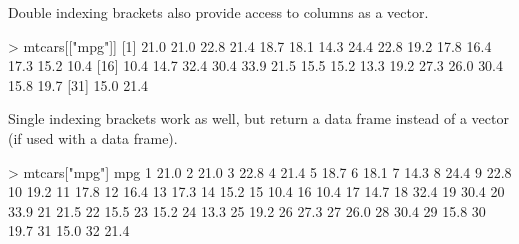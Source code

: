 \documentclass[
]{book}
\newenvironment{Shaded}{\begin{snugshade}}{\end{snugshade}}
\newcommand{\DecValTok}[1]{\textcolor[rgb]{0.00,0.00,0.81}{#1}}
\newcommand{\FloatTok}[1]{\textcolor[rgb]{0.00,0.00,0.81}{#1}}
\newcommand{\NormalTok}[1]{#1}
\newcommand{\SpecialCharTok}[1]{\textcolor[rgb]{0.00,0.00,0.00}{#1}}
\newcommand{\StringTok}[1]{\textcolor[rgb]{0.31,0.60,0.02}{#1}}
\begin{document}
Double indexing brackets also provide access to columns as a vector.

\begin{Shaded}
\begin{Highlighting}[]
\SpecialCharTok{\textgreater{}}\NormalTok{ mtcars[[}\StringTok{"mpg"}\NormalTok{]]}
\NormalTok{ [}\DecValTok{1}\NormalTok{] }\FloatTok{21.0} \FloatTok{21.0} \FloatTok{22.8} \FloatTok{21.4} \FloatTok{18.7} \FloatTok{18.1} \FloatTok{14.3} \FloatTok{24.4} \FloatTok{22.8} \FloatTok{19.2} \FloatTok{17.8} \FloatTok{16.4} \FloatTok{17.3} \FloatTok{15.2} \FloatTok{10.4}
\NormalTok{[}\DecValTok{16}\NormalTok{] }\FloatTok{10.4} \FloatTok{14.7} \FloatTok{32.4} \FloatTok{30.4} \FloatTok{33.9} \FloatTok{21.5} \FloatTok{15.5} \FloatTok{15.2} \FloatTok{13.3} \FloatTok{19.2} \FloatTok{27.3} \FloatTok{26.0} \FloatTok{30.4} \FloatTok{15.8} \FloatTok{19.7}
\NormalTok{[}\DecValTok{31}\NormalTok{] }\FloatTok{15.0} \FloatTok{21.4}
\end{Highlighting}
\end{Shaded}

Single indexing brackets work as well, but return a data frame instead of a vector (if used with a data frame).

\begin{Shaded}
\begin{Highlighting}[]
\SpecialCharTok{\textgreater{}}\NormalTok{ mtcars[}\StringTok{"mpg"}\NormalTok{]}
\NormalTok{    mpg}
\DecValTok{1}  \FloatTok{21.0}
\DecValTok{2}  \FloatTok{21.0}
\DecValTok{3}  \FloatTok{22.8}
\DecValTok{4}  \FloatTok{21.4}
\DecValTok{5}  \FloatTok{18.7}
\DecValTok{6}  \FloatTok{18.1}
\DecValTok{7}  \FloatTok{14.3}
\DecValTok{8}  \FloatTok{24.4}
\DecValTok{9}  \FloatTok{22.8}
\DecValTok{10} \FloatTok{19.2}
\DecValTok{11} \FloatTok{17.8}
\DecValTok{12} \FloatTok{16.4}
\DecValTok{13} \FloatTok{17.3}
\DecValTok{14} \FloatTok{15.2}
\DecValTok{15} \FloatTok{10.4}
\DecValTok{16} \FloatTok{10.4}
\DecValTok{17} \FloatTok{14.7}
\DecValTok{18} \FloatTok{32.4}
\DecValTok{19} \FloatTok{30.4}
\DecValTok{20} \FloatTok{33.9}
\DecValTok{21} \FloatTok{21.5}
\DecValTok{22} \FloatTok{15.5}
\DecValTok{23} \FloatTok{15.2}
\DecValTok{24} \FloatTok{13.3}
\DecValTok{25} \FloatTok{19.2}
\DecValTok{26} \FloatTok{27.3}
\DecValTok{27} \FloatTok{26.0}
\DecValTok{28} \FloatTok{30.4}
\DecValTok{29} \FloatTok{15.8}
\DecValTok{30} \FloatTok{19.7}
\DecValTok{31} \FloatTok{15.0}
\DecValTok{32} \FloatTok{21.4}
\end{Highlighting}
\end{Shaded}
\end{document}
